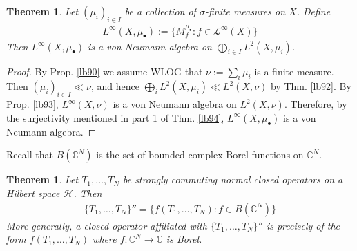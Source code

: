 \documentclass[12pt,b5paper,notitlepage]{article}
\theoremstyle{definition}
\theoremstyle{plain}
\newtheorem{thm}[df]{Theorem}
\newcommand{\mc}{\mathcal}
\newcommand{\blt}{\bullet}
\newcommand{\Cbb}{\mathbb C}
\numberwithin{equation}{section}
\begin{document}
\begin{thm}\label{lb95}
Let $(\mu_i)_{i\in I}$ be a  collection of $\sigma$-finite measures on $X$. Define
\begin{align}
L^\infty(X,\mu_\blt):=\{M^{\mu_\blt}_f:f\in\mc L^\infty(X)\}
\end{align}
Then $L^\infty(X,\mu_\blt)$ is a von Neumann algebra on $\bigoplus_{i\in I}L^2(X,\mu_i)$.
\end{thm}

\begin{proof}
By Prop. \ref{lb90} we assume WLOG that $\nu:=\sum_i\mu_i$ is a finite measure. Then $(\mu_i)_{i\in I}\ll\nu$, and hence $\bigoplus_i L^2(X,\mu_i)\ll L^2(X,\nu)$ by Thm. \ref{lb92}. By Prop. \ref{lb93}, $L^\infty(X,\nu)$ is a von Neumann algebra on $L^2(X,\nu)$. Therefore, by the surjectivity mentioned in part 1 of Thm. \ref{lb94}, $L^\infty(X,\mu_\blt)$ is a von Neumann algebra.
\end{proof}


Recall that $B(\Cbb^N)$ is the set of bounded complex Borel functions on $\Cbb^N$.

\begin{thm}\label{lb96}
Let $T_1,\dots,T_N$ be strongly commuting normal closed operators on a  Hilbert space $\mc H$. Then
\begin{align}\label{eq34}
\{T_1,\dots,T_N\}''=\{f(T_1,\dots,T_N):f\in B(\Cbb^N)\}
\end{align}
More generally, a closed operator affiliated with $\{T_1,\dots,T_N\}''$ is precisely of the form $f(T_1,\dots,T_N)$ where $f:\Cbb^N\rightarrow\Cbb$ is Borel.
\end{thm}
\end{document}
